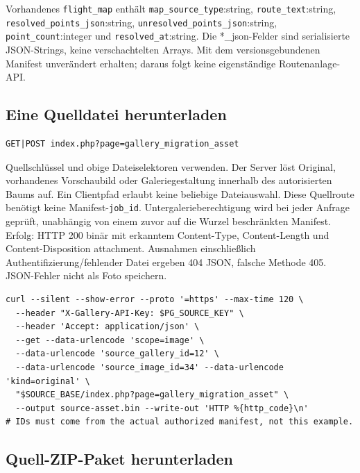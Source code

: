 \documentclass[11pt,a4paper]{article}
\newcommand{\codeword}[1]{\nolinkurl{#1}}
\begin{document}
Vorhandenes \codeword{flight_map} enthält \codeword{map_source_type}:string,
\codeword{route_text}:string, \codeword{resolved_points_json}:string,
\codeword{unresolved_points_json}:string, \codeword{point_count}:integer und
\codeword{resolved_at}:string. Die *\_json-Felder sind serialisierte JSON-Strings, keine
verschachtelten Arrays. Mit dem versionsgebundenen Manifest unverändert erhalten; daraus
folgt keine eigenständige Routenanlage-API.

\subsection{\texorpdfstring{Eine Quelldatei herunterladen}{Eine Quelldatei herunterladen}}

\label{api352:migration-asset}

\begin{lstlisting}[language={}]
GET|POST index.php?page=gallery_migration_asset
\end{lstlisting}

Quellschlüssel und obige Dateiselektoren verwenden. Der Server löst Original, vorhandenes
Vorschaubild oder Galeriegestaltung innerhalb des autorisierten Baums auf. Ein Clientpfad
erlaubt keine beliebige Dateiauswahl. Diese Quellroute benötigt keine
Manifest-\codeword{job_id}. Untergalerieberechtigung wird bei jeder Anfrage geprüft,
unabhängig von einem zuvor auf die Wurzel beschränkten Manifest. Erfolg: HTTP 200 binär mit
erkanntem Content-Type, Content-Length und Content-Disposition attachment. Ausnahmen
einschließlich Authentifizierung/fehlender Datei ergeben 404 JSON, falsche Methode 405.
JSON-Fehler nicht als Foto speichern.

\begin{lstlisting}[language={}]
curl --silent --show-error --proto '=https' --max-time 120 \
  --header "X-Gallery-API-Key: $PG_SOURCE_KEY" \
  --header 'Accept: application/json' \
  --get --data-urlencode 'scope=image' \
  --data-urlencode 'source_gallery_id=12' \
  --data-urlencode 'source_image_id=34' --data-urlencode 'kind=original' \
  "$SOURCE_BASE/index.php?page=gallery_migration_asset" \
  --output source-asset.bin --write-out 'HTTP %{http_code}\n'
# IDs must come from the actual authorized manifest, not this example.
\end{lstlisting}

\subsection{\texorpdfstring{Quell-ZIP-Paket herunterladen}{Quell-ZIP-Paket herunterladen}}
\end{document}
